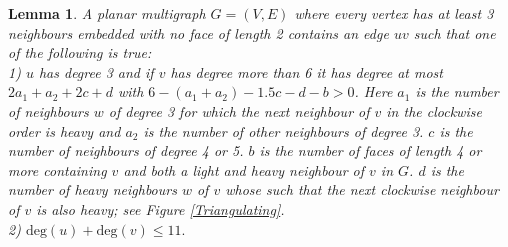 \documentclass{article}
\newcommand{\0}{\mathbb{0}}
\newcommand{\1}{\mathbb{1}}
\newtheorem{lemma}[theorem]{Lemma}
\begin{document}
 \begin{lemma}\label{light+}  \cite{JV13} 
A planar multigraph $ G=(V,E)$ where every vertex has  at least 3 neighbours embedded with no face of length 2 contains  an  edge $uv$ such that one of the following is true: \\
1) $u$ has degree 3 and if $v$ has degree more than 6 it has degree at most $2a_1 + a_2 + 2c +d $ with $ 6-(a_1+a_2) -1.5c -d -b > 0 $. Here $ a_1 $ is the number of neighbours $w $ of degree 3 for which  the next neighbour of $v$  in the clockwise order is heavy and $a_2$ is the number of other neighbours of degree 3.  %
$c$ is the number of neighbours of degree 4 or 5. $b$ is the number of faces of length 4 or more containing $v$ and both a light and heavy neighbour of $v$ in $G$. $d$ is the number of heavy neighbours $w$ of $v$ whose such that the next clockwise neighbour of $v$ is also heavy; see Figure \ref{Triangulating}. \\ %
2) $  \text{deg}(u) + \text{deg}(v) \leq  11. $ %

\end{lemma}
\end{document}
